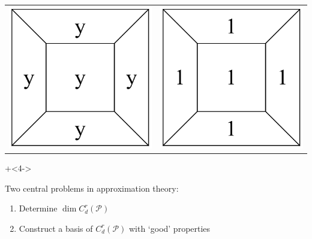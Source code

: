 \documentclass{beamer}
\theoremstyle{definition}
\theoremstyle{remark}
\newcommand{\PC}{\mathcal{P}}
\begin{document}
\begin{frame}
\begin{minipage}{.5\textwidth}
{\begin{tabular}{cc}
\includegraphics[scale=.23]{ToySpliney.pdf} & \includegraphics[scale=.23]{ToySpline1.pdf}
\end{tabular}
}
\end{minipage}

\onslide+<4->{
Two central problems in approximation theory:
\begin{enumerate}
\item Determine $\dim C^r_d(\PC)$
\item Construct a basis of $C^r_d(\PC)$ with `good' properties
\end{enumerate}
}
\end{frame}
\end{document}
